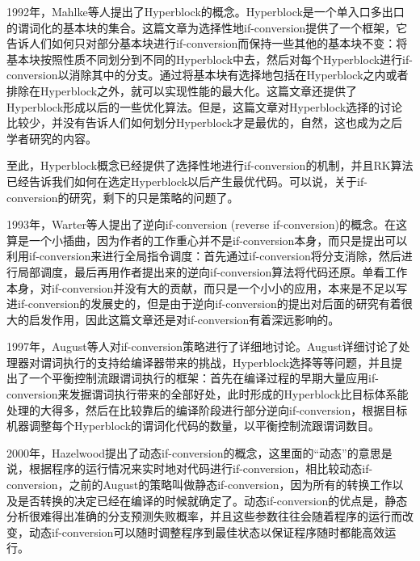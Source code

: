 1992年，Mahlke等人提出了Hyperblock的概念\cite{ScottA.Mahlke1992a}。Hyperblock是一个单入口多出口的谓词化的基本块的集合。这篇文章为选择性地if-conversion提供了一个框架，它告诉人们如何只对部分基本块进行if-conversion而保持一些其他的基本块不变：将基本块按照性质不同划分到不同的Hyperblock中去，然后对每个Hyperblock进行if-conversion以消除其中的分支。通过将基本块有选择地包括在Hyperblock之内或者排除在Hyperblock之外，就可以实现性能的最大化。这篇文章还提供了Hyperblock形成以后的一些优化算法。但是，这篇文章对Hyperblock选择的讨论比较少，并没有告诉人们如何划分Hyperblock才是最优的，自然，这也成为之后学者研究的内容。

至此，Hyperblock概念已经提供了选择性地进行if-conversion的机制，并且RK算法已经告诉我们如何在选定Hyperblock以后产生最优代码。可以说，关于if-conversion的研究，剩下的只是策略的问题了。

1993年，Warter等人提出了逆向if-conversion (reverse if-conversion)的概念\cite{Warter1993}。在这算是一个小插曲，因为作者的工作重心并不是if-conversion本身，而只是提出可以利用if-conversion来进行全局指令调度：首先通过if-conversion将分支消除，然后进行局部调度，最后再用作者提出来的逆向if-conversion算法将代码还原。单看工作本身，对if-conversion并没有大的贡献，而只是一个小小的应用，本来是不足以写进if-conversion的发展史的，但是由于逆向if-conversion的提出对后面的研究有着很大的启发作用，因此这篇文章还是对if-conversion有着深远影响的。

1997年，August等人对if-conversion策略进行了详细地讨论\cite{August1997}。August详细讨论了处理器对谓词执行的支持给编译器带来的挑战，Hyperblock选择等等问题，并且提出了一个平衡控制流跟谓词执行的框架：首先在编译过程的早期大量应用if-conversion来发掘谓词执行带来的全部好处，此时形成的Hyperblock比目标体系能处理的大得多，然后在比较靠后的编译阶段进行部分逆向if-conversion，根据目标机器调整每个Hyperblock的谓词化代码的数量，以平衡控制流跟谓词数目。

2000年，Hazelwood提出了动态if-conversion的概念\cite{Hazelwood00alightweight}，这里面的“动态”的意思是说，根据程序的运行情况来实时地对代码进行if-conversion，相比较动态if-conversion，之前的August的策略叫做静态if-conversion，因为所有的转换工作以及是否转换的决定已经在编译的时候就确定了。动态if-conversion的优点是，静态分析很难得出准确的分支预测失败概率，并且这些参数往往会随着程序的运行而改变，动态if-conversion可以随时调整程序到最佳状态以保证程序随时都能高效运行。